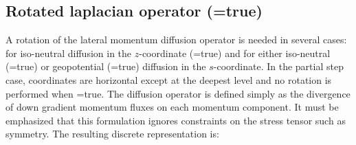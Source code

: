 \subsection   [Rotated laplacian operator (\np{ln\_dynldf\_iso}) ]
			{Rotated laplacian operator (=true)}
\label{DYN_ldf_iso}

A rotation of the lateral momentum diffusion operator is needed in several cases: 
for iso-neutral diffusion in the $z$-coordinate (=true) and for 
either iso-neutral (=true) or geopotential 
(=true) diffusion in the $s$-coordinate. In the partial step 
case, coordinates are horizontal except at the deepest level and no 
rotation is performed when =true. The diffusion operator 
is defined simply as the divergence of down gradient momentum fluxes on each 
momentum component. It must be emphasized that this formulation ignores 
constraints on the stress tensor such as symmetry. The resulting discrete 
representation is:
